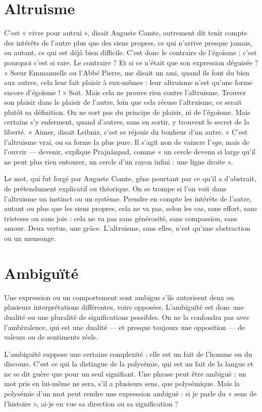 \section{Altruisme}
C'est « vivre pour autrui », disait Auguste Comte, autrement dit
tenir compte des intérêts de l’autre plus que des siens propres,
ce qui n’arrive presque jamais, ou autant, ce qui est déjà bien difficile. C’est
donc le contraire de l’égoïsme ; c’est pourquoi c’est si rare. Le contraire ? Et si
ce n’était que son expression déguisée ? « Sœur Emmanuelle ou l'Abbé Pierre,
me disait un ami, quand ils font du bien aux autres, cela leur fait plaisir à eux-mêmes :
leur altruisme n’est qu’une forme encore d’égoïsme ! » Soit. Mais cela
ne prouve rien contre l’altruisme. Trouver son plaisir dans le plaisir de l’autre,
loin que cela récuse l’altruisme, ce serait plutôt sa définition. On ne sort pas du
principe de plaisir, ni de l’égoïsme. Mais certains s'y enferment, quand
d’autres, sans en sortir, y trouvent le secret de la liberté. « Aimer, disait Leibniz,
c’est se réjouir du bonheur d’un autre. » C’est l’altruisme vrai, ou sa forme la
plus pure. Il s’agit non de vaincre l'{\it ego}, mais de l'ouvrir — devenir, explique Prajnânpad,
comme « un cercle devenu si large qu’il ne peut plus rien entourer, un
cercle d’un rayon infini : une ligne droite ».

Le mot, qui fut forgé par Auguste Comte, gêne pourtant par ce qu'il a
d’abstrait, de prétendument explicatif ou théorique. On se trompe si l'on voit
dans l’altruisme un instinct ou un système. Prendre en compte les intérêts de
l’autre, autant ou plus que les siens propres, cela ne va pas, selon les cas, sans
effort, sans tristesse ou sans joie : cela ne va pas sans générosité, sans compassion,
sans amour. Deux vertus, une grâce. L’altruisme, sans elles, n’est qu'une
abstraction ou un mensonge.

\section{Ambiguïté}
Une expression ou un comportement sont ambigus s’ils autorisent
deux ou plusieurs interprétations différentes, voire opposées.
L’ambiguïté est donc une dualité ou une pluralité de significations possibles.
On ne la confondra pas avec l’ambivalence, qui est une dualité — et
presque toujours une opposition — de valeurs ou de sentiments réels.

L’ambiguïté suppose une certaine complexité : elle est un fait de l’homme
ou du discours. C’est ce qui la distingue de la polysémie, qui est un fait de la
langue et ne se dit guère que pour un seul signifiant. Une phrase peut être
ambiguë ; un mot pris en lui-même ne sera, s’il a plusieurs sens, que polysémique.
Mais la polysémie d’un mot peut rendre une expression ambiguë : si je
parle du « sens de l’histoire », ai-je en vue sa direction ou sa signification ?

